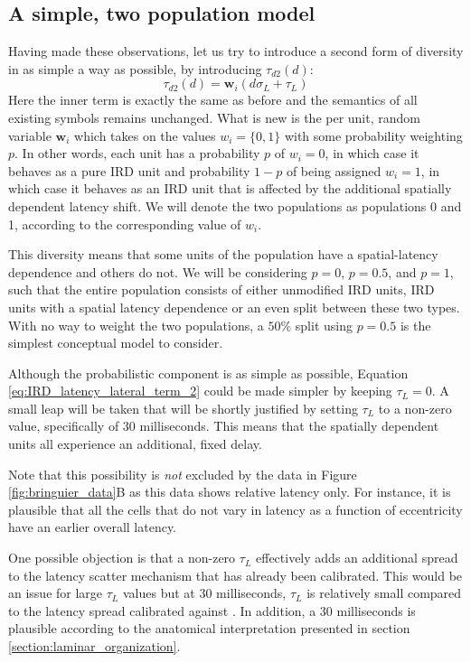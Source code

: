 \documentclass[phd,ianc,twoside]{infthesis}
\begin{document}
\subsection{A simple, two population model}

Having made these observations, let us try to introduce a second form of
diversity in as simple a way as possible, by introducing $\tau_{d2}(d)$:
\begin{equation}
\label{eq:IRD_latency_lateral_term_2}
\tau_{d2}(d) =  \pmb{w}_i(d \sigma_L + \tau_L)
\end{equation}
Here the inner term is exactly the same as before and the semantics of
all existing symbols remains unchanged. What is new is the per unit,
random variable $\pmb{w}_i$ which takes on the values $w_i=\{0,1\}$ with
some probability weighting $p$. In other words, each unit has a
probability $p$ of $w_i=0$, in which case it behaves as a pure IRD unit
and probability $1-p$ of being assigned $w_i=1$, in which case it
behaves as an IRD unit that is affected by the additional spatially
dependent latency shift. We will denote the two populations as
populations 0 and 1, according to the corresponding value of $w_i$.

This diversity means that some units of the population have a
spatial-latency dependence and others do not. We will be considering
$p=0$, $p=0.5$, and $p=1$, such that the entire population consists of
either unmodified IRD units, IRD units with a spatial latency dependence
or an even split between these two types. With no way to weight the two
populations, a $50\%$ split using $p=0.5$ is the simplest conceptual
model to consider.

Although the probabilistic component is as simple as possible, Equation
\ref{eq:IRD_latency_lateral_term_2} could be made simpler by keeping
$\tau_L=0$. A small leap will be taken that will be shortly justified by
setting $\tau_L$ to a non-zero value, specifically of $30$
milliseconds. This means that the spatially dependent units all
experience an additional, fixed delay.

Note that this possibility is \emph{not} excluded by the data in Figure
\ref{fig:bringuier_data}B as this data shows relative latency only. For
instance, it is plausible that all the cells that do not vary in latency
as a function of eccentricity have an earlier overall latency.

One possible objection is that a non-zero $\tau_L$ effectively adds an
additional spread to the latency scatter mechanism that has already been
calibrated. This would be an issue for large $\tau_L$ values but at $30$
milliseconds, $\tau_L$ is relatively small compared to the latency
spread calibrated against \citet{nowak_visneuro95}. In addition, a $30$
milliseconds is plausible according to the anatomical interpretation
presented in section \ref{section:laminar_organization}.
\end{document}
